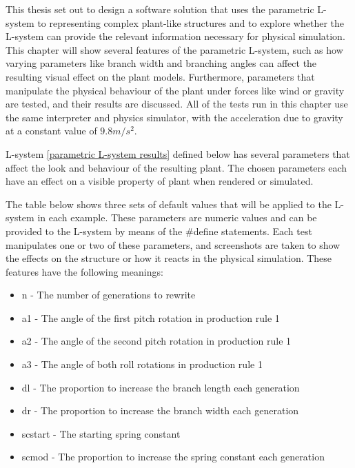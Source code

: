 This thesis set out to design a software solution that uses the parametric L-system to representing complex plant-like structures and to explore whether the L-system can provide the relevant information necessary for physical simulation. This chapter will show several features of the parametric L-system, such as how varying parameters like branch width and branching angles can affect the resulting visual effect on the plant models. Furthermore, parameters that manipulate the physical behaviour of the plant under forces like wind or gravity are tested, and their results are discussed. All of the tests run in this chapter use the same interpreter and physics simulator, with the acceleration due to gravity at a constant value of $9.8m/s^2$. 

L-system \ref{parametric L-system results} defined below has several parameters that affect the look and behaviour of the resulting plant. The chosen parameters each have an effect on a visible property of plant when rendered or simulated.

The table below shows three sets of default values that will be applied to the L-system in each example. These parameters are numeric values and can be provided to the L-system by means of the \#define statements. Each test manipulates one or two of these parameters, and screenshots are taken to show the effects on the structure or how it reacts in the physical simulation. These features have the following meanings:


\begin{itemize}[noitemsep]
	\item n - The number of generations to rewrite
	\item a1 - The angle of the first pitch rotation in production rule 1
	\item a2 - The angle of the second pitch rotation in production rule 1
	\item a3 - The angle of both roll rotations in production rule 1
	\item dl - The proportion to increase the branch length each generation
	\item dr - The proportion to increase the branch width each generation
	\item scstart - The starting spring constant 
	\item scmod - The proportion to increase the spring constant each generation
\end{itemize}

